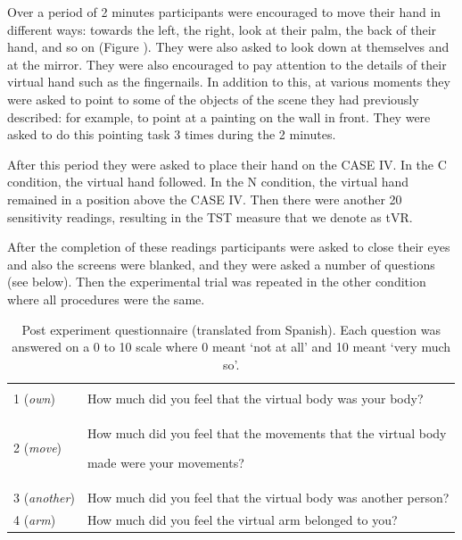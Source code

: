 \documentclass[
		twoside,openright,titlepage,numbers=noenddot,manychapters,
		headinclude,%
                footinclude=false,cleardoublepage=empty,
                BCOR=5mm,
		fontsize=11pt, %
                 enabledeprecatedfontcommands]{scrreprt}
\begin{document}
Over a period of 2 minutes participants were encouraged to move their hand in different ways: towards the left, the right, look at their palm, the back of their hand, and so on (Figure ). They were also asked to look down at themselves and at the mirror. They were also encouraged to pay attention to the details of their virtual hand such as the fingernails. In addition to this, at various moments they were asked to point to some of the objects of the scene they had previously described: for example, to point at a painting on the wall in front. They were asked to do this pointing task 3 times during the 2 minutes.

After this period they were asked to place their hand on the CASE IV. In the C condition, the virtual hand followed. In the N condition, the virtual hand remained in a position above the CASE IV.  Then there were another 20 sensitivity readings, resulting in the TST measure that we denote as tVR. 

After the completion of these readings participants were asked to close their eyes and also the screens were blanked, and they were asked a number of questions (see below). Then the experimental trial was repeated in the other condition where all procedures were the same.


\begin{table}[tb]
\caption{Post experiment questionnaire (translated from Spanish). Each question was answered on a 0 to 10 scale where 0 meant `not at all' and 10 meant `very much so'.}


\begin{tabular*}{1.00\textwidth}{ p{}  p{} }

\hline\hline
 \\
1  (\emph{own}) & How much did you feel that the virtual body was your body?  \\
2 (\emph{move})  & How much did you feel that the movements that the virtual body

 made were your movements? \\
3 (\emph{another}) &  How much did you feel that the virtual body was another person? \\
 4 (\emph{arm}) &  How much did you feel the virtual arm belonged to you?  \\
 [1ex]
\hline
\end{tabular*}

\label{sens_t1}
\end{table}
\end{document}
